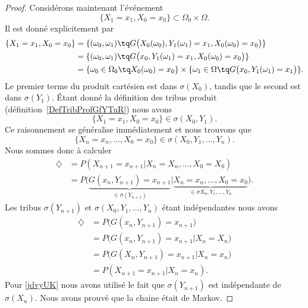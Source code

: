 \begin{proof}
	Considérons maintenant l'événement
	\begin{equation}
		\{ X_1=x_1,X_0=x_0 \}\subset \Omega_0\times \Omega.
	\end{equation}
	Il est donné explicitement par
	\begin{subequations}
		\begin{align}
			\{ X_1=x_1,X_0=x_0 \} & =\{ (\omega_0,\omega_1)\tq G\big( X_0(\omega_0),Y_1(\omega_1)=x_1,X_0(\omega_0)=x_0 \big) \}                           \\
			                      & =\{ (\omega_0,\omega_1)\tq G\big( x_0,Y_1(\omega_1)=x_1,X_0(\omega_0)=x_0 \big) \}                                     \\
			                      & =\{ \omega_0\in \Omega_0\tq X_0(\omega_0)=x_0 \}\times \{ \omega_1\in \Omega\tq G\big( x_0,Y_1(\omega_1)=x_1 \big) \}.
		\end{align}
	\end{subequations}
	Le premier terme du produit cartésien est dans \( \sigma(X_0)\), tandis que le second est dans \( \sigma(Y_1)\). Étant donné la définition des tribus produit (définition~\ref{DefTribProfGfYTuR}) nous avons
	\begin{equation}
		\{ X_1=x_1,X_0=x_0 \}\in\sigma(X_0,Y_1).
	\end{equation}
	Ce raisonnement se généralise immédiatement et nous trouvons que
	\begin{equation}
		\{ X_n=x_n,\ldots, X_0=x_0 \}\in\sigma(X_0,Y_1,\ldots, Y_n).
	\end{equation}
	Nous sommes donc à calculer
	\begin{subequations}
		\begin{align}
			\diamondsuit & =P(X_{n+1}=x_{n+1}|X_n=X_n,\ldots, X_0=X_0)                                                                                                  \\
			             & =P\big( \underbrace{G(x_n,Y_{n+1})=x_{n+1}}_{\in\sigma(Y_{n+1})}|\underbrace{X_n=x_n,\ldots, X_0=x_0}_{\in\sigma X_0,Y_1,\ldots, Y_n} \big).
		\end{align}
	\end{subequations}
	Les tribus \( \sigma(Y_{n+1})\) et \( \sigma(X_0,Y_1,\ldots, Y_n)\) étant indépendantes nous avons
	\begin{subequations}
		\begin{align}
			\diamondsuit & =P\big( G(x_n,Y_{n+1})=x_{n+1} \big)                              \\
			             & =P\big( G(x_n,Y_{n+1})=x_{n+1}|X_n=X_n \big)       \label{jdvyUK} \\
			             & =P\big( G(X_n,Y_{n+1})=x_{n+1}|X_n=x_n \big)                      \\
			             & =P(X_{n+1}=x_{n+1}|X_n=x_n).
		\end{align}
	\end{subequations}
	Pour \eqref{jdvyUK} nous avons utilisé le fait que \( \sigma(Y_{n+1})\) est indépendante de \( \sigma(X_n)\). Nous avons prouvé que la chaine était de Markov.
\end{proof}
